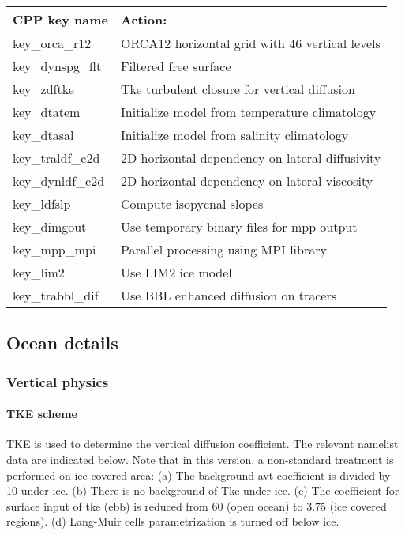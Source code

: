 \documentclass[12pt]{article}
\begin{document}
\begin{center}
\begin{tabular}{|l|l|}
\hline
\textbf{CPP key name} & \textbf{Action:} \\
\hline
key\_orca\_r12        & ORCA12 horizontal grid with 46 vertical levels \\
\hline
key\_dynspg\_flt      & Filtered free surface \\
\hline
key\_zdftke           & Tke turbulent closure for vertical diffusion \\
\hline
key\_dtatem           & Initialize model from temperature climatology \\
\hline
key\_dtasal           & Initialize model from salinity climatology \\
\hline
key\_traldf\_c2d      & 2D horizontal dependency on lateral diffusivity \\
\hline
key\_dynldf\_c2d      & 2D horizontal dependency on lateral viscosity \\
\hline
key\_ldfslp           & Compute isopycnal slopes \\
\hline
key\_dimgout          & Use temporary binary files for mpp output \\
\hline
key\_mpp\_mpi         & Parallel processing using MPI library \\
\hline
key\_lim2             & Use LIM2 ice model \\
\hline
key\_trabbl\_dif      & Use BBL enhanced diffusion on tracers \\
\hline
\end{tabular}
\end{center}


\subsection{Ocean details}

\subsubsection{Vertical physics}

\paragraph{TKE scheme \\}

TKE is used to determine the vertical diffusion coefficient. The relevant namelist data are indicated below. Note that in this version, a non-standard treatment is performed on ice-covered area: (a) The background avt coefficient is divided by 10 under ice. (b) There is no background of Tke under ice. (c) The coefficient for surface input of tke (ebb) is reduced from 60 (open ocean) to 3.75 (ice covered regions). (d) Lang-Muir cells parametrization is turned off below ice.
\end{document}
